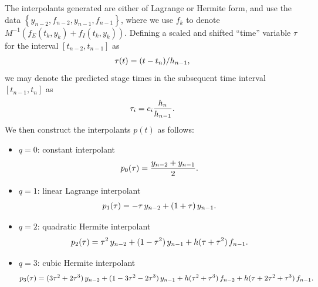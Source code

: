 \documentclass[letterpaper,10pt,english]{sphinxmanual}
\begin{document}
The interpolants generated are either of Lagrange or Hermite form, and
use the data \(\left\{ y_{n-2}, f_{n-2}, y_{n-1}, f_{n-1}
\right\}\), where we use \(f_{k}\) to denote \(M^{-1}
\left(f_E(t_k,y_k) + f_I(t_k,y_k)\right)\).  Defining a scaled and
shifted ``time'' variable \(\tau\) for the interval \([t_{n-2},
t_{n-1}]\) as
\begin{gather}
\begin{split}\tau(t) = (t-t_n)/h_{n-1},\end{split}\notag
\end{gather}
we may denote the predicted stage times in the subsequent time
interval \([t_{n-1}, t_{n}]\) as
\begin{gather}
\begin{split}\tau_i = c_i \frac{h_n}{h_{n-1}}.\end{split}\notag
\end{gather}
We then construct the interpolants \(p(t)\) as follows:
\begin{itemize}
\item {} 
\(q=0\): constant interpolant
\begin{gather}
\begin{split}p_0(\tau) = \frac{y_{n-2} + y_{n-1}}{2}.\end{split}\notag
\end{gather}
\item {} 
\(q=1\): linear Lagrange interpolant
\begin{gather}
\begin{split}p_1(\tau) = -\tau\, y_{n-2} + (1+\tau)\, y_{n-1}.\end{split}\notag
\end{gather}
\item {} 
\(q=2\): quadratic Hermite interpolant
\begin{gather}
\begin{split}p_2(\tau) =  \tau^2\,y_{n-2} + (1-\tau^2)\,y_{n-1} + h(\tau+\tau^2)\,f_{n-1}.\end{split}\notag
\end{gather}
\item {} 
\(q=3\): cubic Hermite interpolant
\begin{gather}
\begin{split}p_3(\tau) =  (3\tau^2 + 2\tau^3)\,y_{n-2} +
(1-3\tau^2-2\tau^3)\,y_{n-1} + h(\tau^2+\tau^3)\,f_{n-2} +
h(\tau+2\tau^2+\tau^3)\,f_{n-1}.\end{split}\notag
\end{gather}
\end{itemize}
\end{document}

